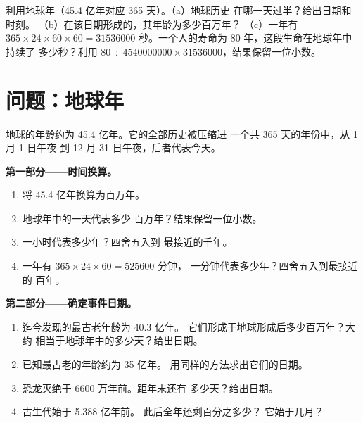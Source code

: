 \begin{exercise}[$\star\star\star$]\label{exo:g7:geological-time:12}
利用地球年（45.4 亿年对应 365 天）。（a）地球历史
在哪一天过半？给出日期和时刻。
（b）在该日期形成的，其年龄为多少百万年？
（c）一年有 $365 \times 24 \times 60 \times 60 = \num{31536000}$
秒。一个人的寿命为 80 年，这段生命在地球年中持续了
多少秒？利用 $80 \div \num{4540000000} \times
\num{31536000}$，结果保留一位小数。
\end{exercise}

\section{问题：地球年}

\begin{problem}
\label{pb:g7:geological-time:1}
地球的年龄约为 45.4 亿年。它的全部历史被压缩进
一个共 365 天的年份中，从 1 月 1 日午夜
到 12 月 31 日午夜，后者代表今天。

\medskip
\noindent\textbf{第一部分——时间换算。}\par\nopagebreak
\begin{enumerate}[beginpenalty=10000]
  \item 将 45.4 亿年换算为百万年。
  \item 地球年中的一天代表多少
        百万年？结果保留一位小数。
  \item 一小时代表多少年？四舍五入到
        最接近的千年。
  \item 一年有 $365 \times 24 \times 60 = \num{525600}$ 分钟，
        一分钟代表多少年？四舍五入到最接近的
        百年。
\end{enumerate}

\medskip
\noindent\textbf{第二部分——确定事件日期。}\par\nopagebreak
\begin{enumerate}[resume, beginpenalty=10000]
  \item 迄今发现的最古老年龄为 40.3 亿年。
        它们形成于地球形成后多少百万年？大约
        相当于地球年中的多少天？给出日期。
  \item 已知最古老的年龄约为 35 亿年。
        用同样的方法求出它们的日期。
  \item 恐龙灭绝于 6600 万年前。距年末还有
        多少天？给出日期。
  \item 古生代始于 5.388 亿年前。
        此后全年还剩百分之多少？
        它始于几月？
\end{enumerate}


\end{problem}
